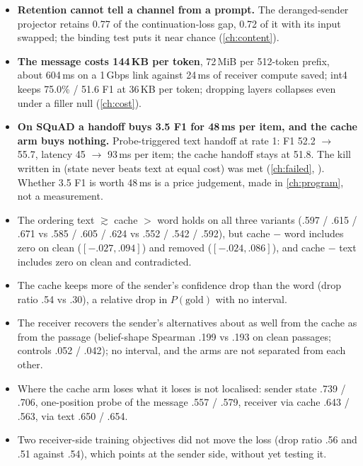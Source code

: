 \documentclass[11pt,a4paper]{report}
\begin{document}
\begin{tcolorbox}[enhanced,breakable,colback=shownc!4,colframe=shownc,boxrule=0.6pt,arc=1pt,title={\textbf{SHOWN} (number, then control)}]
\begin{itemize}[leftmargin=1.2em]
\item \textbf{Retention cannot tell a channel from a prompt.} The deranged-sender projector retains 0.77 of the continuation-loss gap, 0.72 of it with its input swapped; the binding test puts it near chance (\cref{ch:content}).
\item \textbf{The message costs 144\,KB per token}, 72\,MiB per 512-token prefix, about 604\,ms on a 1\,Gbps link against 24\,ms of receiver compute saved; int4 keeps 75.0\% / 51.6 F1 at 36\,KB per token; dropping layers collapses even under a filler null (\cref{ch:cost}).
\item \textbf{On SQuAD a handoff buys 3.5 F1 for 48\,ms per item, and the cache arm buys nothing.} Probe-triggered text handoff at rate 1: F1 52.2 $\to$ 55.7, latency 45 $\to$ 93\,ms per item; the cache handoff stays at 51.8. The kill written in  (state never beats text at equal cost) was met (\cref{ch:failed}, ). Whether 3.5 F1 is worth 48\,ms is a price judgement, made in \cref{ch:program}, not a measurement.
\end{itemize}
\end{tcolorbox}

\begin{tcolorbox}[enhanced,breakable,colback=suggc!5,colframe=suggc,boxrule=0.6pt,arc=1pt,title={\textbf{SUGGESTED} (direction consistent, an interval includes zero)}]
\small
\begin{itemize}[leftmargin=1.2em]
\item The ordering text $\gtrsim$ cache $>$ word holds on all three variants (.597 / .615 / .671 vs .585 / .605 / .624 vs .552 / .542 / .592), but cache $-$ word includes zero on clean ($[-.027, .094]$) and removed ($[-.024, .086]$), and cache $-$ text includes zero on clean and contradicted.
\item The cache keeps more of the sender's confidence drop than the word (drop ratio .54 vs .30), a relative drop in $P(\text{gold})$ with no interval.
\item The receiver recovers the sender's alternatives about as well from the cache as from the passage (belief-shape Spearman .199 vs .193 on clean passages; controls .052 / .042); no interval, and the arms are not separated from each other.
\item Where the cache arm loses what it loses is not localised: sender state .739 / .706, one-position probe of the message .557 / .579, receiver via cache .643 / .563, via text .650 / .654.
\item Two receiver-side training objectives did not move the loss (drop ratio .56 and .51 against .54), which points at the sender side, without yet testing it.
\end{itemize}
\end{tcolorbox}
\end{document}
